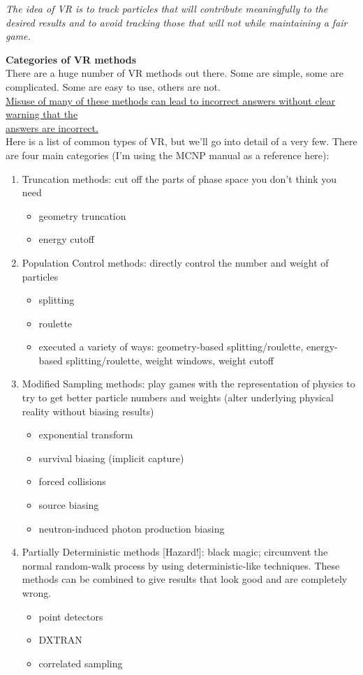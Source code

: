 \documentclass[12pt]{article}
\begin{document}
\textit{The idea of VR is to track particles that will contribute meaningfully to the desired results and to avoid tracking those that will not while maintaining a fair game.}

\textbf{Categories of VR methods}\\
There are a huge number of VR methods out there. Some are simple, some are complicated. Some are easy to use, others are not. \\
\underline{Misuse of many of these methods can lead to incorrect answers without clear warning that the} \\\underline{answers are incorrect.}\\
Here is a list of common types of VR, but we'll go into detail of a very few. There are four main categories (I'm using the MCNP manual as a reference here):
%
\begin{enumerate}
\item Truncation methods: cut off the parts of phase space you don't think you need
  \begin{itemize}
  \item geometry truncation
  \item energy cutoff
  \end{itemize}
  
\item Population Control methods: directly control the number and weight of particles
  \begin{itemize}
  \item splitting
  \item roulette
  \item executed a variety of ways: geometry-based splitting/roulette, energy-based splitting/roulette, weight windows, weight cutoff
  \end{itemize}

\item Modified Sampling methods: play games with the representation of physics to try to get better particle numbers and weights (alter underlying physical reality without biasing results)
  \begin{itemize}
  \item exponential transform
  \item survival biasing (implicit capture)
  \item forced collisions
  \item source biasing
  \item neutron-induced photon production biasing
  \end{itemize}

\item Partially Deterministic methods [Hazard!]: black magic; circumvent the normal random-walk process by using deterministic-like techniques. These methods can be combined to give results that look good and are completely wrong.
  \begin{itemize}
  \item point detectors
  \item DXTRAN
  \item correlated sampling
  \end{itemize}
\end{enumerate}
\end{document}
